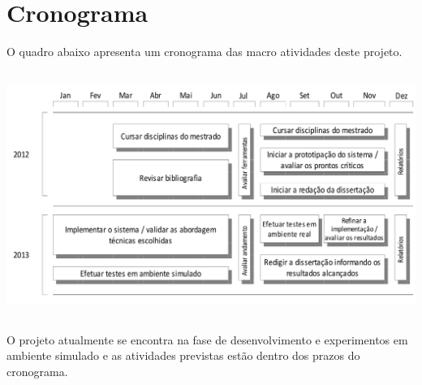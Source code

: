 \documentclass{article}
\begin{document}
\section{Cronograma}

O quadro abaixo apresenta um cronograma das macro atividades deste projeto. 


\includegraphics[width=16cm,height=8cm]{../images/chrono.png}

O projeto atualmente se encontra na fase de desenvolvimento e experimentos em
ambiente simulado e as atividades previstas estão dentro dos prazos do
cronograma.
\end{document}
